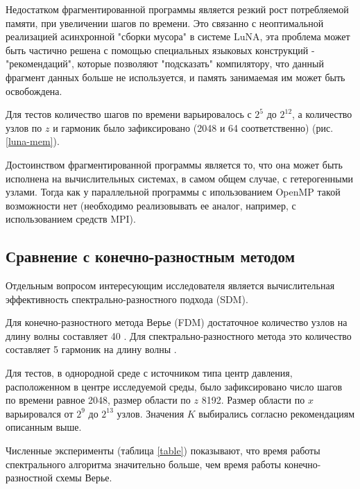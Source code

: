 Недостатком фрагментированной программы является резкий рост потребляемой памяти, при увеличении шагов по времени.
Это связанно с неоптимальной реализацией асинхронной "сборки мусора" в системе LuNA,
эта проблема может быть частично решена с помощью специальных языковых конструкций - "рекомендаций",
которые позволяют "подсказать" компилятору, что данный фрагмент данных больше не используется, и память занимаемая им может быть освобождена.

Для тестов количество шагов по времени варьировалось с $2^5$ до $2^{12}$, а количество узлов по $z$
и гармоник было зафиксировано (2048 и 64 соответственно) (рис. \ref{luna-mem}).


Достоинством фрагментированной программы является то, что она может быть исполнена на
вычислительных системах, в самом общем случае, с гетерогенными узлами.
Тогда как у параллельной программы с ипользованием OpenMP такой возможности нет
(необходимо реализовывать ее аналог, например, с использованием средств MPI).

\subsection{Сравнение с конечно-разностным методом}

Отдельным вопросом интересующим исследователя является вычислительная эффективность спектрально-разностного подхода (SDM).

Для конечно-разностного метода Верье (FDM) достаточное количество узлов на длину волны составляет 40 \cite{vir}.
Для спектрально-разностного метода это количество составляет 5 гармоник на длину волны \cite{mart}.

Для тестов, в однородной среде с источником типа центр давления, расположенном в центре исследуемой среды,
было зафиксировано число шагов по времени равное 2048, размер области по $z$ 8192.
Размер области по $x$ варьировался от $2^9$ до $2^{13}$ узлов. Значения $K$ выбирались согласно рекомендациям описанным выше.

Численные эксперименты (таблица \ref{table}) показывают, что время работы спектрального алгоритма значительно больше,
чем время работы конечно-разностной схемы Верье.

